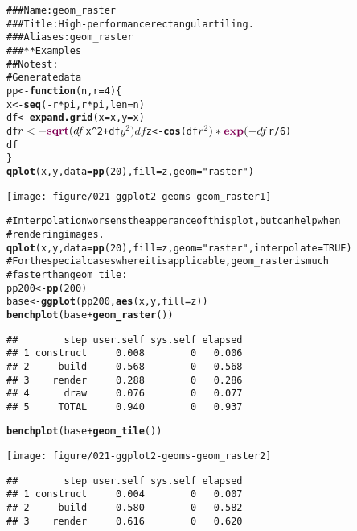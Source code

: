 \documentclass[a4paper,titlepage]{tufte-handout}\usepackage{graphicx, color}
\makeatletter
\def\maxwidth{ %
  \ifdim\Gin@nat@width>\linewidth
    \linewidth
  \else
    \Gin@nat@width
  \fi
}
\newcommand{\hlfunctioncall}[1]{\textcolor[rgb]{0.501960784313725,0,0.329411764705882}{\textbf{#1}}}%
\newcommand{\hlstring}[1]{\textcolor[rgb]{0.6,0.6,1}{#1}}%
\newcommand{\hlcomment}[1]{\textcolor[rgb]{0.180392156862745,0.6,0.341176470588235}{#1}}%
\newenvironment{kframe}{%
 \def\at@end@of@kframe{}%
 \ifinner\ifhmode%
  \def\at@end@of@kframe{\end{minipage}}%
  \begin{minipage}{\columnwidth}%
 \fi\fi%
 \def\FrameCommand##1{\hskip\@totalleftmargin \hskip-\fboxsep
 \colorbox{shadecolor}{##1}\hskip-\fboxsep
     \hskip-\linewidth \hskip-\@totalleftmargin \hskip\columnwidth}%
 \MakeFramed {\advance\hsize-\width
   \@totalleftmargin\z@ \linewidth\hsize
   \@setminipage}}%
 {\par\unskip\endMakeFramed%
 \at@end@of@kframe}
\newenvironment{knitrout}{}{} %
\makeatother
\begin{document}
\begin{knitrout}
\color{fgcolor}\begin{kframe}
\begin{alltt}
\hlcomment{### Name: geom_raster}
\hlcomment{### Title: High-performance rectangular tiling.}
\hlcomment{### Aliases: geom_raster}
\hlcomment{### ** Examples}
\hlcomment{## No test: }
\hlcomment{# Generate data}
pp <- \hlfunctioncall{function} (n,r=4) \{
 x <- \hlfunctioncall{seq}(-r*pi, r*pi, len=n)
 df <- \hlfunctioncall{expand.grid}(x=x, y=x)
 df$r <- \hlfunctioncall{sqrt}(df$x^2 + df$y^2)
 df$z <- \hlfunctioncall{cos}(df$r^2)*\hlfunctioncall{exp}(-df$r/6)
 df
\}
\hlfunctioncall{qplot}(x, y, data = \hlfunctioncall{pp}(20), fill = z, geom = \hlstring{"raster"})
\end{alltt}
\end{kframe}\texttt{[image: figure/021-ggplot2-geoms-geom\_raster1]} \begin{kframe}\begin{alltt}
\hlcomment{# Interpolation worsens the apperance of this plot, but can help when}
\hlcomment{# rendering images.}
\hlfunctioncall{qplot}(x, y, data = \hlfunctioncall{pp}(20), fill = z, geom = \hlstring{"raster"}, interpolate = TRUE)
\hlcomment{# For the special cases where it is applicable, geom_raster is much}
\hlcomment{# faster than geom_tile:}
pp200 <- \hlfunctioncall{pp}(200)
base <- \hlfunctioncall{ggplot}(pp200, \hlfunctioncall{aes}(x, y, fill = z))
\hlfunctioncall{benchplot}(base + \hlfunctioncall{geom_raster}())
\end{alltt}
\begin{verbatim}
##        step user.self sys.self elapsed
## 1 construct     0.008        0   0.006
## 2     build     0.568        0   0.568
## 3    render     0.288        0   0.286
## 4      draw     0.076        0   0.077
## 5     TOTAL     0.940        0   0.937
\end{verbatim}
\begin{alltt}
\hlfunctioncall{benchplot}(base + \hlfunctioncall{geom_tile}())
\end{alltt}
\end{kframe}\texttt{[image: figure/021-ggplot2-geoms-geom\_raster2]} \begin{kframe}\begin{verbatim}
##        step user.self sys.self elapsed
## 1 construct     0.004        0   0.007
## 2     build     0.580        0   0.582
## 3    render     0.616        0   0.620

\end{verbatim}
\end{kframe}
\end{knitrout}
\end{document}
